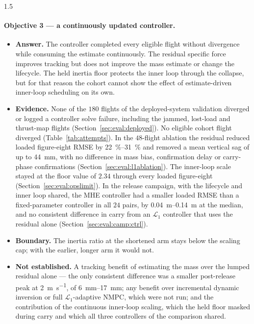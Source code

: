 \begin{spacing}{1.5}
\paragraph{Objective 3 --- a continuously updated controller.}
\begin{itemize}
\item \textbf{Answer.} The controller completed every eligible flight without
divergence while consuming the estimate continuously. The residual specific force
improves tracking but does not improve the mass estimate or change the
lifecycle. The held inertia floor protects the inner loop through the collapse,
but for that reason the cohort cannot show the effect of estimate-driven
inner-loop scheduling on its own.
\item \textbf{Evidence.} None of the $180$ flights of the deployed-system
validation diverged or logged a controller solve failure, including the jammed,
lost-load and thrust-map flights (Section~\ref{sec:eval:deployed}). No eligible
cohort flight diverged (Table~\ref{tab:attempts}). In the $48$-flight ablation the residual reduced
loaded figure-eight RMSE by \SIrange{22}{31}{\percent} and removed a mean
vertical sag of up to \SI{44}{\milli\meter}, with no difference in mass bias,
confirmation delay or carry-phase confirmations
(Section~\ref{sec:eval:l1ablation}). The inner-loop scale stayed at the floor
value of $2.34$ through every loaded figure-eight
(Section~\ref{sec:eval:opslimit}). In the release campaign, with the lifecycle
and inner loop shared, the MHE controller had a smaller loaded RMSE than a
fixed-parameter controller in all $24$ pairs, by \SIrange{0.04}{0.14}{\meter}
at the median, and no consistent difference in carry from an $\mathcal{L}_1$
controller that uses the residual alone (Section~\ref{sec:eval:camp:ctrl}).
\item \textbf{Boundary.} The inertia ratio at the shortened arm stays below the
scaling cap; with the earlier, longer arm it would not.
\item \textbf{Not established.} A tracking benefit of estimating the mass over
the lumped residual alone --- the only consistent difference was a smaller
post-release peak at \SI{2}{\meter\per\second}, of \SIrange{6}{17}{\milli\meter};
any benefit over incremental dynamic inversion or full $\mathcal{L}_1$-adaptive
NMPC, which were not run; and the contribution of the continuous inner-loop
scaling, which the held floor masked during carry and which all three
controllers of the comparison shared.
\end{itemize}


\end{spacing}
